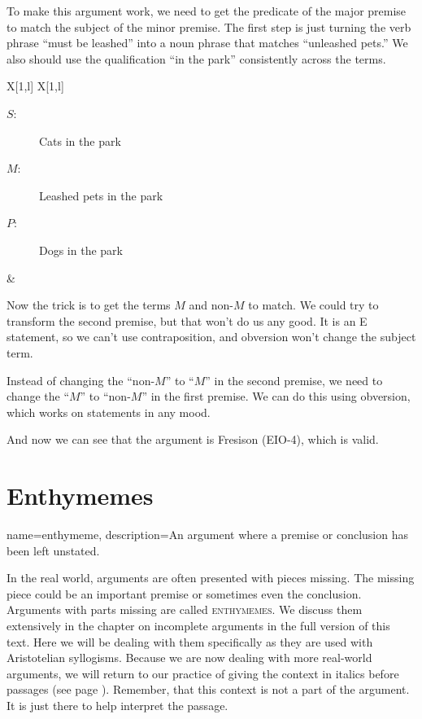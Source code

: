 To make this argument work, we need to get the predicate of the major premise to match the subject of the minor premise. The first step is just turning the verb phrase ``must be leashed'' into a noun phrase that matches ``unleashed pets.'' We also should use the qualification ``in the park'' consistently across the terms.

\begin{tabu}{{X[1,l] X[1,l]}}

\begin{description}
\item[$S$:] Cats in the park
\item[$M$:] Leashed pets in the park
\item[$P$:] Dogs in the park
\end{description}

&

\begin{kormanize}
\end{kormanize}

\end{tabu}

Now the trick is to get the terms $M$ and non-$M$ to match. We could try to transform the second premise, but that won't do us any good. It is an E statement, so we can't use contraposition, and obversion won't change the subject term.

Instead of changing the ``non-$M$'' to ``$M$'' in the second premise, we need to change the ``$M$'' to ``non-$M$'' in the first premise. We can do this using obversion, which works on statements in any mood.

\begin{kormanize}
\end{kormanize}

And now we can see that the argument is Fresison (EIO-4), which is valid.


\section{Enthymemes}
\label{sec:enthymemes}
{
name=enthymeme,
description={An argument where a premise or conclusion has been left unstated.}
}


In the real world, arguments are often presented with pieces missing. The missing piece could be an important premise or sometimes even the conclusion.  Arguments with parts missing are called \textsc{\glspl{enthymeme}}. \label{def:enthymeme} We discuss them extensively in the chapter on incomplete arguments in the full version of this text. Here we will be dealing with them specifically as they are used with Aristotelian syllogisms. Because we are now dealing with more real-world arguments, we will return to our practice of giving the context in italics before passages (see page \pageref{fig:statements_and_context}). Remember, that this context is not a part of the argument. It is just there to help interpret the passage.

